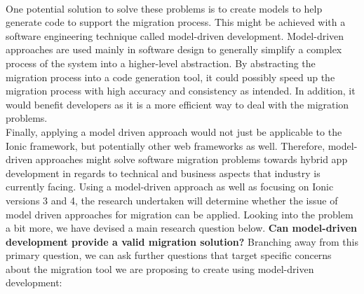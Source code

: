 \documentclass[conference]{IEEEtran}
\begin{document}
\\ One potential solution to solve these problems is to create models to help generate code to support the migration process. 
This might be achieved with a software engineering technique called model-driven development. Model-driven approaches are used mainly in software design to generally 
simplify a complex process of the system into a higher-level abstraction. By abstracting the migration process into a code generation tool, it could possibly speed up the 
migration process with high accuracy and consistency as intended. In addition, it would benefit developers as it is a more efficient way to deal with the migration problems.
\\ Finally, applying a model driven approach would not just be applicable to the Ionic framework, but potentially other web frameworks as well. 
Therefore, model-driven approaches might solve software migration problems towards hybrid app development in regards to technical and business aspects 
that industry is currently facing. Using a model-driven approach as well as focusing on Ionic versions 3 and 4, the research undertaken will determine whether 
the issue of model driven approaches for migration can be applied.
\newline \newline Looking into the problem a bit more, we have devised a main research question below.
\newline \newline \textbf{Can model-driven development provide a valid migration solution?}
\newline \newline Branching away from this primary question, we can ask further questions that target specific concerns about the migration tool we are proposing to create using model-driven development:
\end{document}
